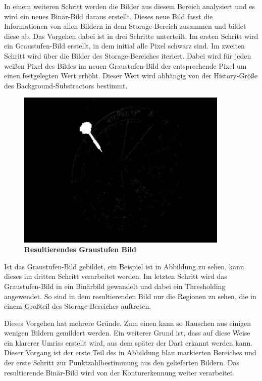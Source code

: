 In einem weiteren Schritt werden die Bilder aus diesem Bereich analysiert und es wird ein neues Binär-Bild daraus erstellt. Dieses neue Bild fasst die Informationen von allen Bildern in dem Storage-Bereich zusammen und bildet diese ab.
Das Vorgehen dabei ist in drei Schritte unterteilt.
Im ersten Schritt wird ein Graustufen-Bild erstellt, in dem initial alle Pixel schwarz sind. 
Im zweiten Schritt wird über die Bilder des Storage-Bereiches iteriert. Dabei wird für jeden weißen Pixel des Bildes im neuen Graustufen-Bild der entsprechende Pixel um einen festgelegten Wert erhöht. Dieser Wert wird abhängig von der History-Größe des Background-Substractors bestimmt.
\begin{figure}[ht]
\centering
\includegraphics[width=0.9\textwidth]{media/blobimg}
\caption{\textbf{Resultierendes Graustufen Bild}}
\label{Fig:greyimg}
\end{figure}
Ist das Graustufen-Bild gebildet, ein Beispiel ist in Abbildung  zu sehen, kann dieses im dritten Schritt verarbeitet werden. 
Im letzten Schritt wird das Graustufen-Bild in ein Binärbild gewandelt und dabei ein Thresholding angewendet. So sind in dem resultierenden Bild nur die Regionen zu sehen, die in einem Großteil des Storage-Bereiches auftreten. 

Dieses Vorgehen hat mehrere Gründe. 
Zum einen kann so Rauschen aus einigen wenigen Bildern gemildert werden. 
Ein weiterer Grund ist, dass auf diese Weise ein klarerer Umriss erstellt wird, aus dem später der Dart erkannt werden kann. 
Dieser Vorgang ist der erste Teil des in Abbildung  blau markierten Bereiches und der erste Schritt zur Punktzahlbestimmung aus den gelieferten Bildern. Das resultierende Binär-Bild wird von der Konturerkennung weiter verarbeitet.

